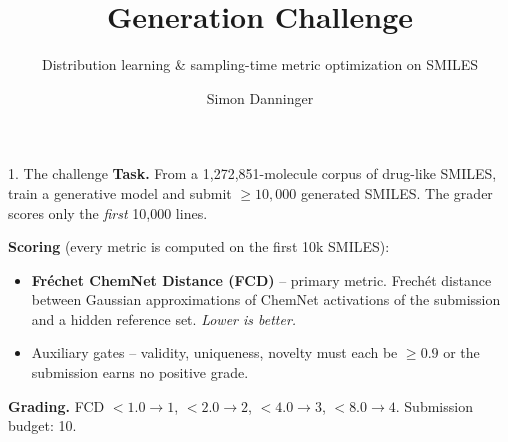 \documentclass[aspectratio=169,11pt]{beamer}
\title{Generation Challenge}
\subtitle{Distribution learning \& sampling-time metric optimization on SMILES}
\author{Simon Danninger}
\institute{JKU Linz -- AI in Life Sciences}
\date{}
\begin{document}
\begin{frame}
  \titlepage
\end{frame}

\begin{frame}{1. The challenge}
  \textbf{Task.} From a 1{,}272{,}851-molecule corpus of drug-like SMILES,
  train a generative model and submit $\geq 10{,}000$ generated SMILES.
  The grader scores only the \emph{first} 10{,}000 lines.

  \medskip
  \textbf{Scoring} (every metric is computed on the first 10k SMILES):
  \begin{itemize}
    \item \textbf{Fr\'echet ChemNet Distance (FCD)} -- primary metric.
      Frech\'et distance between Gaussian approximations of ChemNet
      activations of the submission and a hidden reference set.
      \emph{Lower is better.}
    \item Auxiliary gates -- validity, uniqueness, novelty must each be
      $\geq 0.9$ or the submission earns no positive grade.
  \end{itemize}

  \medskip
  \textbf{Grading.}\quad
  FCD $<1.0\rightarrow 1$,\;
  $<2.0\rightarrow 2$,\;
  $<4.0\rightarrow 3$,\;
  $<8.0\rightarrow 4$. \quad Submission budget: 10.
\end{frame}
\end{document}
